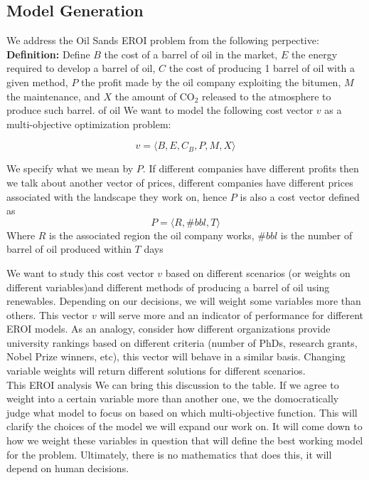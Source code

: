 \documentclass[12pt]{article}
\begin{document}
\subsection{Model Generation}

We address the Oil Sands EROI problem from the following perpective: \\

{\bf Definition:} Define $B$ the cost of a barrel of oil in the market, $E$ the energy required to develop a barrel of oil, $C$ the cost of producing 1 barrel of oil with a given method, $P$ the profit made by the oil company exploiting the bitumen,  $M$ the maintenance, and $X$ the amount of CO$_2$ released to the atmosphere to produce such barrel. of oil We want to model the following cost vector $v$ as a multi-objective optimization problem:

\begin{displaymath}
v = \langle B, E, C_B, P,  M, X \rangle
\end{displaymath}

We specify what we mean by $P$. If different companies have different profits then we talk about another vector of prices, different companies have different prices associated with the landscape they work on, hence $P$ is also a cost vector defined as 
\begin{displaymath}
P = \langle R, \#bbl, T \rangle
\end{displaymath}
Where $R$ is the associated region the oil company works, $\#bbl$ is the number of barrel of oil produced within $T$ days

We want to study this cost vector $v$ based on different scenarios (or weights on different variables)and different methods of producing a barrel of oil using renewables. Depending on our decisions, we will weight some variables more than others. This vector $v$ will serve more and an indicator of performance for different EROI models. As an analogy, consider how different organizations provide university rankings based on different criteria (number of PhDs, research grants, Nobel Prize winners, etc), this vector will behave in a similar basis.  Changing variable weights will return different solutions for different scenarios. \\

This EROI analysis We can bring this discussion to the table. If we agree to weight into a certain variable more than another one, we the domocratically judge what model to focus on based on which multi-objective function. This will clarify the choices of the model we will expand our work on. It will come down to how we weight these variables in question that will define the best working model for the problem. Ultimately, there is no mathematics that does this, it will depend on human decisions. \\
\end{document}
